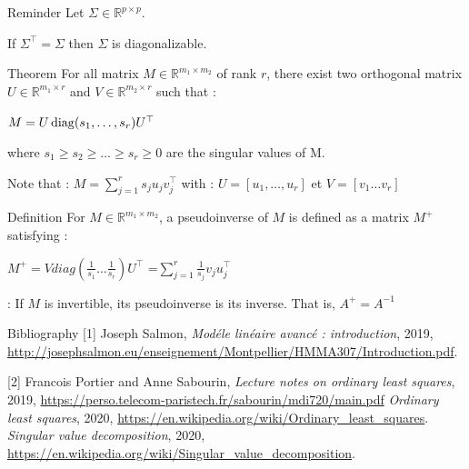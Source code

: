 \documentclass[unknownkeysallowed]{beamer}
\begin{document}
\begin{frame}
\begin{block}{Reminder}
Let $\Sigma\in\mathbb{R}^{p \times p}$.

If $\Sigma^{\top}=\Sigma$ then $\Sigma$ is diagonalizable.
\end{block}
\begin{alertblock}{Theorem}
For all matrix $M\in\mathbb{R}^{m_1 \times m_2}$ of rank $r$, there exist two orthogonal matrix $U\in \mathbb{R}^{m_1 \times r}$ and $V\in\mathbb{R}^{m_2 \times r}$ such that :
\begin{center}
    $M=U \operatorname{diag}(s_{1},\dots, s_{r})U^{\top}$
\end{center}
where $s_{1}\ge s_{2} \ge \dots \ge s_{r} \ge 0$ are the singular values of M.
\end{alertblock}
\vspace{0.5cm}
Note that : $M=\sum_{j=1}^r s_{j}u_{j}v_{j}^{\top}$ with : $U=[u_{1},\dots,u_{r}]$
et $V=[v_{1} \dots v_{r}]$
\end{frame}


\begin{frame}
\begin{block}{Definition}
For $M\in\mathbb{R}^{m_1 \times m_2}$, a pseudoinverse of $M$ is defined as a matrix $M^{+}$ satisfying :
\begin{center}
    $M^{+}=Vdiag(\frac{1}{s_{1}} \dots \frac{1}{s_{r}})U^{\top}$
    =$\sum\limits_{j=1}^r \frac{1}{s_{j}}v_{j}u_{j}^{\top}$
\end{center}
\end{block}
\vspace{0.5cm}
\rem : If $M$ is invertible, its pseudoinverse is its inverse. That is, $A^{+}=A^{-1}$
\end{frame}

\begin{frame}{Bibliography}
[1] Joseph Salmon, \textit{Modéle linéaire avancé : introduction}, 2019, \url{http://josephsalmon.eu/enseignement/Montpellier/HMMA307/Introduction.pdf}.
\newline

[2] Francois Portier and Anne Sabourin, \textit{Lecture notes on ordinary least squares}, 2019, \url{https://perso.telecom-paristech.fr/sabourin/mdi720/main.pdf}
\newline
\newline
[3] \textit{Ordinary least squares}, 2020,
\url{https://en.wikipedia.org/wiki/Ordinary_least_squares}.
\newline
\newline
[4] \textit{Singular value decomposition}, 2020,
\url{https://en.wikipedia.org/wiki/Singular_value_decomposition}.

\printbibliography
\end{frame}
\end{document}

